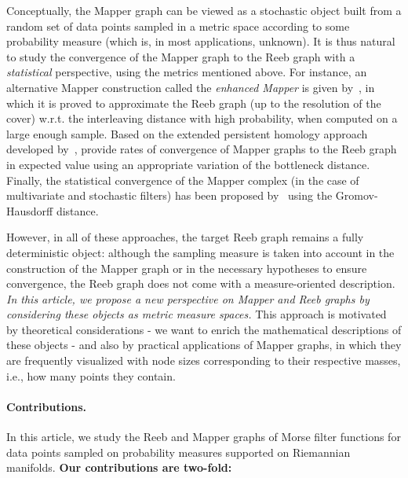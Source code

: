 \documentclass[pdflatex,sn-mathphys-ay]{sn-jnl}%
\newcommand{\change}[1]{\noindent #1}
\theoremstyle{thmstyleone}%
\begin{document}
\change{Conceptually, the Mapper graph can be viewed as a stochastic object built from a random set of data points sampled in a metric space according to some probability measure (which is, in most applications, unknown).} It is thus natural to study the convergence of the Mapper graph to the Reeb graph with a {\em statistical} perspective, using the metrics mentioned above. For instance, an alternative Mapper construction called the \emph{enhanced Mapper} is given by~\citet{brown2021probabilistic}, in which it is proved to approximate the Reeb graph (up to the resolution of the cover) w.r.t. the interleaving distance with high probability, when computed on a large enough sample.  Based on the extended persistent homology approach developed by~\citet{carriere2018structure}, \citet{carriere2018statistical} provide rates of convergence of Mapper graphs to the Reeb graph in expected value using an appropriate variation of the bottleneck distance.  
Finally, the statistical convergence of the Mapper complex (in the case of multivariate and stochastic filters) has been proposed by~\citet{carriere2022statistical} using the Gromov-Hausdorff distance.

However, in all of these approaches, the target Reeb graph remains a fully deterministic object: although the sampling measure is taken into account in the construction of the Mapper graph or in the necessary hypotheses to ensure convergence, the Reeb graph does not come with a measure-oriented description. {\em In this article, we propose a new perspective on Mapper and Reeb graphs by considering these objects as metric measure spaces.} This approach is motivated by theoretical considerations - we want to enrich the mathematical descriptions of these objects - and also by practical applications of Mapper graphs, in which they are frequently visualized with node sizes corresponding to their respective masses, i.e., how many points they contain. 

\paragraph{Contributions.} In this article, we study the Reeb and Mapper graphs of Morse filter functions for data points sampled on probability measures supported on Riemannian manifolds. {\bf Our contributions are two-fold:}
\end{document}
